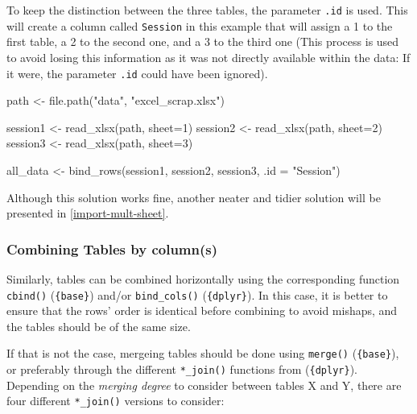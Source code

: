 \documentclass[
]{book}
\newenvironment{Shaded}{\begin{snugshade}}{\end{snugshade}}
\newcommand{\AttributeTok}[1]{\textcolor[rgb]{0.77,0.63,0.00}{#1}}
\newcommand{\DecValTok}[1]{\textcolor[rgb]{0.00,0.00,0.81}{#1}}
\newcommand{\FunctionTok}[1]{\textcolor[rgb]{0.00,0.00,0.00}{#1}}
\newcommand{\NormalTok}[1]{#1}
\newcommand{\OtherTok}[1]{\textcolor[rgb]{0.56,0.35,0.01}{#1}}
\newcommand{\StringTok}[1]{\textcolor[rgb]{0.31,0.60,0.02}{#1}}
\begin{document}
To keep the distinction between the three tables, the parameter \texttt{.id} is used. This will create a column called \texttt{Session} in this example that will assign a 1 to the first table, a 2 to the second one, and a 3 to the third one (This process is used to avoid losing this information as it was not directly available within the data: If it were, the parameter \texttt{.id} could have been ignored).

\begin{Shaded}
\begin{Highlighting}[]
\NormalTok{path }\OtherTok{\textless{}{-}} \FunctionTok{file.path}\NormalTok{(}\StringTok{"data"}\NormalTok{, }\StringTok{"excel\_scrap.xlsx"}\NormalTok{)}

\NormalTok{session1 }\OtherTok{\textless{}{-}} \FunctionTok{read\_xlsx}\NormalTok{(path, }\AttributeTok{sheet=}\DecValTok{1}\NormalTok{)}
\NormalTok{session2 }\OtherTok{\textless{}{-}} \FunctionTok{read\_xlsx}\NormalTok{(path, }\AttributeTok{sheet=}\DecValTok{2}\NormalTok{) }
\NormalTok{session3 }\OtherTok{\textless{}{-}} \FunctionTok{read\_xlsx}\NormalTok{(path, }\AttributeTok{sheet=}\DecValTok{3}\NormalTok{)}

\NormalTok{all\_data }\OtherTok{\textless{}{-}} \FunctionTok{bind\_rows}\NormalTok{(session1, session2, session3, }\AttributeTok{.id =} \StringTok{"Session"}\NormalTok{)}
\end{Highlighting}
\end{Shaded}

Although this solution works fine, another neater and tidier solution will be presented in \ref{import-mult-sheet}.

\hypertarget{combining-tables-by-columns}{%
\subsubsection{Combining Tables by column(s)}\label{combining-tables-by-columns}}

Similarly, tables can be combined horizontally using the corresponding function \texttt{cbind()} (\texttt{\{base\}}) and/or \texttt{bind\_cols()} (\texttt{\{dplyr\}}). In this case, it is better to ensure that the rows' order is identical before combining to avoid mishaps, and the tables should be of the same size.

If that is not the case, mergeing tables should be done using \texttt{merge()} (\texttt{\{base\}}), or preferably through the different \texttt{*\_join()} functions from (\texttt{\{dplyr\}}). Depending on the \emph{merging degree} to consider between tables X and Y, there are four different \texttt{*\_join()} versions to consider:
\end{document}
